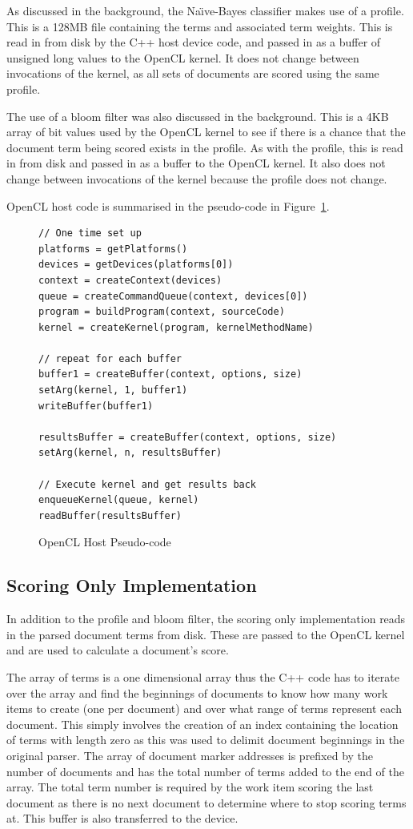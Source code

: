 As discussed in the background, the Na{\"{\i}}ve-Bayes classifier makes use of a
profile. This is a 128MB file containing the terms and associated term weights.
This is read in from disk by the C++ host device code, and passed in as a buffer
of unsigned long values to the OpenCL kernel. It does not change between
invocations of the kernel, as all sets of documents are scored using the same
profile.

The use of a bloom filter was also discussed in the background. This is a 4KB
array of bit values used by the OpenCL kernel to see if there is a chance that
the document term being scored exists in the profile. As with the profile, this
is read in from disk and passed in as a buffer to the OpenCL kernel. It also
does not change between invocations of the kernel because the profile does not
change.

OpenCL host code is summarised in the pseudo-code in
Figure~\ref{fig:openCLPseudocode}.

\begin{figure}
\small\begin{verbatim}
// One time set up
platforms = getPlatforms()
devices = getDevices(platforms[0])
context = createContext(devices)
queue = createCommandQueue(context, devices[0])
program = buildProgram(context, sourceCode)
kernel = createKernel(program, kernelMethodName)

// repeat for each buffer
buffer1 = createBuffer(context, options, size)
setArg(kernel, 1, buffer1)
writeBuffer(buffer1)

resultsBuffer = createBuffer(context, options, size)
setArg(kernel, n, resultsBuffer)

// Execute kernel and get results back
enqueueKernel(queue, kernel)
readBuffer(resultsBuffer)
\end{verbatim}
\caption{OpenCL Host Pseudo-code}
\label{fig:openCLPseudocode}
\end{figure}

\subsection{Scoring Only Implementation}

In addition to the profile and bloom filter, the scoring only implementation
reads in the parsed document terms from disk. These are passed to the OpenCL
kernel and are used to calculate a document's score.

The array of terms is a one dimensional array thus the C++ code has to iterate
over the array and find the beginnings of documents to know how many work items
to create (one per document) and over what range of terms represent each
document. This simply involves the creation of an index containing the location
of terms with length zero as this was used to delimit document beginnings in the
original parser. The array of document marker addresses is prefixed by the
number of documents and has the total number of terms added to the end of the
array. The total term number is required by the work item scoring the last
document as there is no next document to determine where to stop scoring terms
at. This buffer is also transferred to the device.

